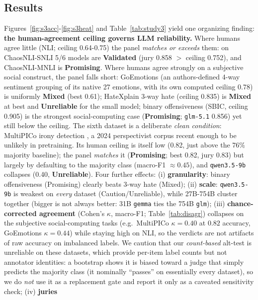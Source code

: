 \subsection{Results}
Figures~\ref{fig:s3acc}-\ref{fig:s3heat} and Table~\ref{tab:study3} yield one organizing finding:
\textbf{the human-agreement ceiling governs LLM reliability.} Where humans agree little (NLI; ceiling 0.64-0.75) the
panel \emph{matches or exceeds} them: on ChaosNLI-SNLI 5/6 models are \textbf{Validated} (jury 0.858 $>$ ceiling
0.752), and ChaosNLI-MNLI is \textbf{Promising}. Where humans agree strongly on a subjective social construct, the panel falls
short: GoEmotions (an authors-defined 4-way sentiment grouping of its native 27 emotions, with its own computed
ceiling 0.78) is uniformly \textbf{Mixed} (best 0.61); HateXplain 3-way hate
(ceiling 0.835) is \textbf{Mixed} at best and \textbf{Unreliable} for the small model; binary offensiveness (SBIC,
ceiling 0.905) is the strongest social-computing case (\textbf{Promising}; \texttt{glm-5.1} 0.856) yet still below
the ceiling. The sixth dataset is a deliberate \emph{clean condition}: MultiPICo irony detection
\citep{casola2024multipico}, a 2024 perspectivist corpus recent enough to be unlikely in pretraining. Its human
ceiling is itself low (0.82, just above the 76\% majority baseline); the panel \emph{matches} it
(\textbf{Promising}; best 0.82, jury 0.83) but largely by defaulting to the majority class (macro-F1 ${\approx}0.45$),
and \texttt{qwen3.5-9b} collapses (0.40, \textbf{Unreliable}). Four further effects: (i) \textbf{granularity}: binary offensiveness (Promising) clearly beats 3-way
hate (Mixed); (ii) \textbf{scale}: \texttt{qwen3.5-9b} is weakest on \emph{every} dataset (Caution/Unreliable),
while 27B-754B cluster together (bigger is not always better: 31B \texttt{gemma} ties the 754B \texttt{glm});
(iii) \textbf{chance-corrected agreement} (Cohen's $\kappa$, macro-F1; Table~\ref{tab:disagr}) collapses on the
subjective social-computing tasks (e.g.\ MultiPICo $\kappa{=}0.40$ at $0.82$ accuracy, GoEmotions $\kappa{=}0.44$)
while staying high on NLI, so the verdicts are not artifacts of raw accuracy on imbalanced labels. We caution that
our \emph{count-based} alt-test is unreliable on these datasets, which provide per-item label counts but not
annotator identities: a bootstrap shows it is biased toward a judge that simply predicts the majority class (it
nominally ``passes'' on essentially every dataset), so we do \emph{not} use it as a replacement gate and report it
only as a caveated sensitivity check; (iv) \textbf{juries}
